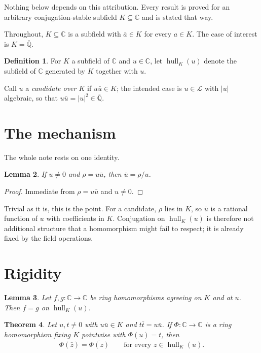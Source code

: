\documentclass[11pt]{article}
\newtheorem{theorem}{Theorem}[section]
\newtheorem{lemma}[theorem]{Lemma}
\theoremstyle{definition}
\newtheorem{definition}[theorem]{Definition}
\theoremstyle{remark}
\newcommand{\C}{\mathbb{C}}
\newcommand{\Q}{\mathbb{Q}}
\newcommand{\Qbar}{\overline{\Q}}
\newcommand{\hull}{\operatorname{hull}}
\begin{document}
Nothing below depends on this attribution. Every result is proved for an
arbitrary conjugation-stable subfield $K\subseteq\C$ and is stated that way.

Throughout, $K\subseteq\C$ is a subfield with $\bar a\in K$ for every $a\in K$.
The case of interest is $K=\Qbar$.

\begin{definition}
For $K$ a subfield of $\C$ and $u\in\C$, let $\hull_K(u)$ denote the subfield of
$\C$ generated by $K$ together with $u$.
\end{definition}

Call $u$ a \emph{candidate over $K$} if $u\bar u\in K$; the intended case is
$u\in\mathcal{L}$ with $|u|$ algebraic, so that $u\bar u=|u|^2\in\Qbar$.

\section{The mechanism}

The whole note rests on one identity.

\begin{lemma}\label{lem:rho}
If $u\neq0$ and $\rho=u\bar u$, then $\bar u=\rho/u$.
\end{lemma}

\begin{proof}
Immediate from $\rho = u\bar u$ and $u \neq 0$.
\end{proof}

Trivial as it is, this is the point. For a candidate, $\rho$ lies in $K$, so
$\bar u$ is a rational function of $u$ with coefficients in $K$. Conjugation on
$\hull_K(u)$ is therefore not additional structure that a homomorphism might
fail to respect; it is already fixed by the field operations.

\section{Rigidity}

\begin{lemma}\label{lem:eqon}
Let $f,g\colon\C\to\C$ be ring homomorphisms agreeing on $K$ and at $u$. Then
$f=g$ on $\hull_K(u)$.
\end{lemma}

\begin{theorem}\label{thm:conjcomm}
Let $u,t\neq0$ with $u\bar u\in K$ and $t\bar t=u\bar u$. If
$\Phi\colon\C\to\C$ is a ring homomorphism fixing $K$ pointwise with
$\Phi(u)=t$, then
\[
  \Phi(\bar z)=\overline{\Phi(z)}\qquad\text{for every }z\in\hull_K(u).
\]
\end{theorem}
\end{document}
